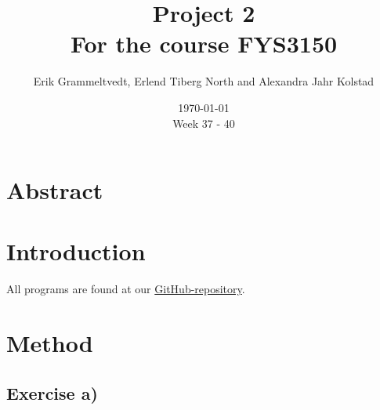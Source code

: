 \documentclass{article}
\begin{document}
\addtocounter{page}{0}

\title{Project 2 \\
      \large For the course FYS3150}
\date{\today \\
    \vspace{1mm}
    \large Week 37 - 40}

\author{Erik Grammeltvedt, Erlend Tiberg North and Alexandra Jahr Kolstad}

\maketitle

\vspace{1cm}

\tableofcontents

\vspace{1cm}



\section{Abstract} \label{sec:Abstract}




\vspace{1cm}

\section{Introduction} \label{sec:Introduction}


All programs are found at our \href{https://github.com/Erikbgram/Fys3150}{GitHub-repository}. \\


\vspace{1cm}

\section{Method} \label{sec:Method}



\subsection{Exercise a)} \label{sec:Method a)}
\end{document}
